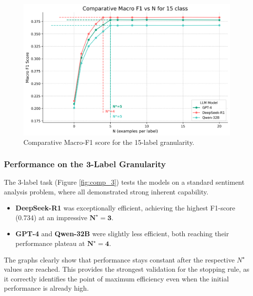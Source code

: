 \begin{figure}[H]
    \centering
    \includegraphics[width=\textwidth]{Images/comparative_15_class.png}
    \caption[Macro-F1 vs. N for 15-Label Granularity]{Comparative Macro-F1 score for the 15-label granularity.}
    \label{fig:comp_15}
\end{figure}

\subsubsection{Performance on the 3-Label Granularity}

The 3-label task (Figure \ref{fig:comp_3}) tests the models on a standard sentiment analysis problem, where all demonstrated strong inherent capability.
\begin{itemize}
    \item \textbf{DeepSeek-R1} was exceptionally efficient, achieving the highest F1-score (0.734) at an impressive $\mathbf{N^{\star} = 3}$.
    \item \textbf{GPT-4} and \textbf{Qwen-32B} were slightly less efficient, both reaching their performance plateau at $\mathbf{N^{\star} = 4}$.
\end{itemize}
The graphs clearly show that performance stays constant after the respective $N^{\star}$ values are reached. This provides the strongest validation for the stopping rule, as it correctly identifies the point of maximum efficiency even when the initial performance is already high.

